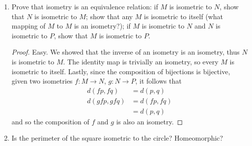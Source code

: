 \documentclass[11pt, a4paper, latinreim, shortsets]{notes}
\begin{document}
\begin{enumerate}[label={\bfseries 2.\arabic*}]
	\begin{enumerate}[label=\alph*)]
		\item Prove that every isometry is continuous.
			\begin{proof}
				Since $d(fp, fq) = d(p, q)$, it follows $\delta = \epsilon$ guarantees continuity for any
				$p,q \in N$. Indeed, isometries are even uniformly continuous!
			\end{proof}
		\item Prove that every isometry is a homeomorphism.
			\begin{proof}
				Recall that homeomorphisms are continuous bijections with continuous inverses. Since $f$ is a
				continuous bijection, we just have to prove the inverse is continuous. Since $(f^{-1}fp,f^{-1}fq)
				= (p,q)$, it follows $d(f^{-1}fp, f^{-1}fq) = d(p,q) = d(fp, fq) = d(f^{-1}fp,d^{-1}fq)$.
				This means the inverse is also an isometry, and is thus continuous, and every isometry is a
				homeomorphism.
			\end{proof}
		\item Prove that [0,1] is not isometric to [0,2].
			\begin{proof}
				Not sure if this is obvious or not; are we assuming a choice of metric?
			\end{proof}
	\end{enumerate}

	\item Prove that isometry is an equivalence relation: if $M$ is isometric to $N$, show that $N$
	is isometric to $M$; show that any $M$ is isometric to itself (what mapping of $M$ to $M$ is an
	isometry?); if $M$ is isometric to $N$ and $N$ is isometric to $P$, show that $M$ is isometric to $P$.

	\begin{proof}
		Easy. We showed that the inverse of an isometry is an isometry, thus $N$ is isometric to $M$.
		The identity map is trivially an isometry, so every $M$ is isometric to itself. Lastly, since
		the composition of bijections is bijective, given two isometries $f : M \to N$, $g : N \to P$,
		it follows that
		\begin{align}
			d(fp, fq) &= d(p,q) \\
			d(gfp, gfq) &= d(fp, fq) \\
									&= d(p,q)
		\end{align}
		and so the composition of $f$ and $g$ is also an isometry.
	\end{proof}

	\item Is the perimeter of the square isometric to the circle? Homeomorphic?


\end{enumerate}
\end{document}
